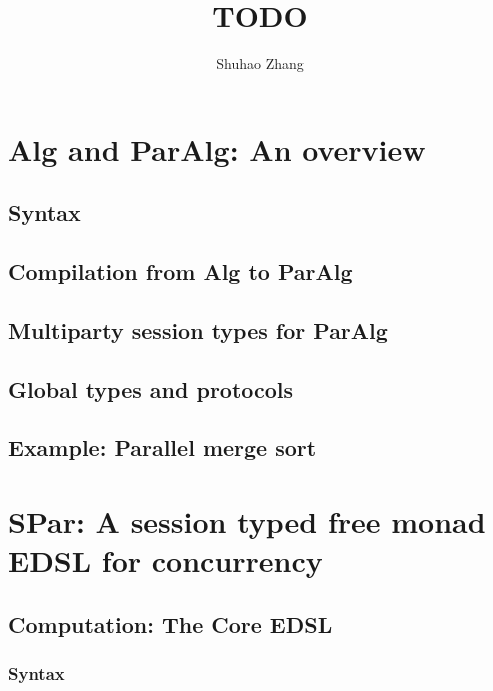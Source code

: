 \documentclass[a4paper, twoside]{report}
\title{TODO}
\author{Shuhao Zhang}
\begin{document}




\tableofcontents



% 
% 
\chapter{Alg and ParAlg: An overview}
\section{Syntax}
\section{Compilation from Alg to ParAlg}
\section{Multiparty session types for ParAlg}
\section{Global types and protocols}
\section{Example: Parallel merge sort}

\chapter{SPar: A session typed free monad EDSL for concurrency}
\section{Computation: The Core EDSL}
\subsection{Syntax}
\end{document}
